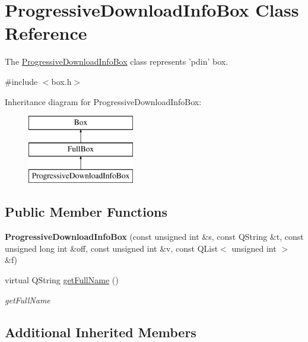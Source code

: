 \hypertarget{class_progressive_download_info_box}{\section{Progressive\-Download\-Info\-Box Class Reference}
\label{class_progressive_download_info_box}
}


The \hyperlink{class_progressive_download_info_box}{Progressive\-Download\-Info\-Box} class represents 'pdin' box.  




{\ttfamily \#include $<$box.\-h$>$}

Inheritance diagram for Progressive\-Download\-Info\-Box\-:\begin{figure}[H]
\begin{center}
\leavevmode
\includegraphics[height=3.000000cm]{class_progressive_download_info_box}
\end{center}
\end{figure}
\subsection*{Public Member Functions}
\begin{DoxyCompactItemize}
\item 
\hypertarget{class_progressive_download_info_box_a56d856c9d28d9d238c7a273f957a1fb7}{{\bfseries Progressive\-Download\-Info\-Box} (const unsigned int \&s, const Q\-String \&t, const unsigned long int \&off, const unsigned int \&v, const Q\-List$<$ unsigned int $>$ \&f)}\label{class_progressive_download_info_box_a56d856c9d28d9d238c7a273f957a1fb7}

\item 
virtual Q\-String \hyperlink{class_progressive_download_info_box_a31f8b06687aff8fed0fc103c94636a7c}{get\-Full\-Name} ()
\begin{DoxyCompactList}\small\item\em get\-Full\-Name \end{DoxyCompactList}\end{DoxyCompactItemize}
\subsection*{Additional Inherited Members}


